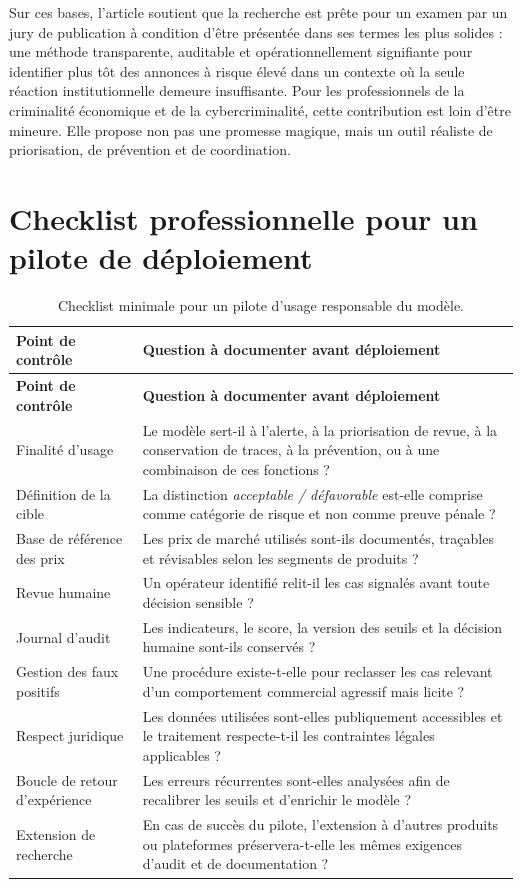 \documentclass[10pt,a4paper]{article}
\begin{document}
Sur ces bases, l'article soutient que la recherche est prête pour un examen par un jury de publication à condition d'être présentée dans ses termes les plus solides : une méthode transparente, auditable et opérationnellement signifiante pour identifier plus tôt des annonces à risque élevé dans un contexte où la seule réaction institutionnelle demeure insuffisante. Pour les professionnels de la criminalité économique et de la cybercriminalité, cette contribution est loin d'être mineure. Elle propose non pas une promesse magique, mais un outil réaliste de priorisation, de prévention et de coordination.

\newpage

\appendix

\section{Checklist professionnelle pour un pilote de déploiement}
\begin{longtable}{p{5.0cm} p{10.2cm}}
\caption{Checklist minimale pour un pilote d'usage responsable du modèle.}\\
\toprule
\textbf{Point de contrôle} & \textbf{Question à documenter avant déploiement} \\
\midrule
\endfirsthead
\toprule
\textbf{Point de contrôle} & \textbf{Question à documenter avant déploiement} \\
\midrule
\endhead
Finalité d'usage & Le modèle sert-il à l'alerte, à la priorisation de revue, à la conservation de traces, à la prévention, ou à une combinaison de ces fonctions ? \\
Définition de la cible & La distinction \emph{acceptable / défavorable} est-elle comprise comme catégorie de risque et non comme preuve pénale ? \\
Base de référence des prix & Les prix de marché utilisés sont-ils documentés, traçables et révisables selon les segments de produits ? \\
Revue humaine & Un opérateur identifié relit-il les cas signalés avant toute décision sensible ? \\
Journal d'audit & Les indicateurs, le score, la version des seuils et la décision humaine sont-ils conservés ? \\
Gestion des faux positifs & Une procédure existe-t-elle pour reclasser les cas relevant d'un comportement commercial agressif mais licite ? \\
Respect juridique & Les données utilisées sont-elles publiquement accessibles et le traitement respecte-t-il les contraintes légales applicables ? \\
Boucle de retour d'expérience & Les erreurs récurrentes sont-elles analysées afin de recalibrer les seuils et d'enrichir le modèle ? \\
Extension de recherche & En cas de succès du pilote, l'extension à d'autres produits ou plateformes préservera-t-elle les mêmes exigences d'audit et de documentation ? \\
\bottomrule
\end{longtable}
\end{document}
